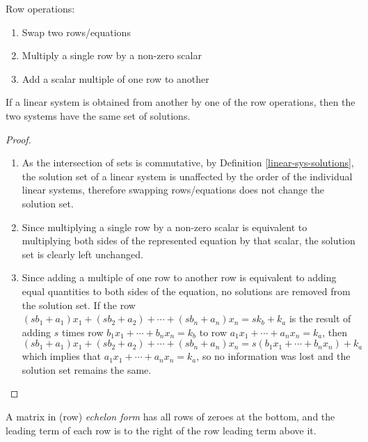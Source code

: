 \documentclass[12pt]{article}
\begin{document}
\begin{defn}\label{row-op}
    Row operations: \begin{enumerate}
        \item Swap two rows/equations
        \item Multiply a single row by a non-zero scalar
        \item Add a scalar multiple of one row to another
    \end{enumerate}
\end{defn}

\begin{thm}\label{solutions-unchanged-by-row-ops}
    If a linear system is obtained from another by one of the row operations, then the two systems have the same set of solutions.
\end{thm}

\begin{proof}\proofbreak
    \begin{enumerate}
        \item As the intersection of sets is commutative, by Definition \ref{linear-sys-solutions}, the solution set of a linear system is unaffected by the order of the individual linear systems, therefore swapping rows/equations does not change the solution set.
        \item Since multiplying a single row by a non-zero scalar is equivalent to multiplying both sides of the represented equation by that scalar, the solution set is clearly left unchanged.
        \item Since adding a multiple of one row to another row is equivalent to adding equal quantities to both sides of the equation, no solutions are removed from the solution set. If the row $(sb_1 + a_1)x_1 + (sb_2 + a_2) + \cdots + (sb_n + a_n)x_n = sk_b + k_a$ is the result of adding $s$ times row $b_1x_1 + \cdots + b_nx_n = k_b$ to row $a_1x_1 + \cdots + a_nx_n = k_a$, then $(sb_1 + a_1)x_1 + (sb_2 + a_2) + \cdots + (sb_n + a_n)x_n = s(b_1x_1 + \cdots + b_nx_n) + k_a$  which implies that $a_1x_1 + \cdots + a_nx_n = k_a$, so no information was lost and the solution set remains the same.
    \end{enumerate}
\end{proof}

\begin{defn}
    A matrix in (row) \emph{echelon form} has all rows of zeroes at the bottom, and the leading term of each row is to the right of the row leading term above it.
\end{defn}
\end{document}
